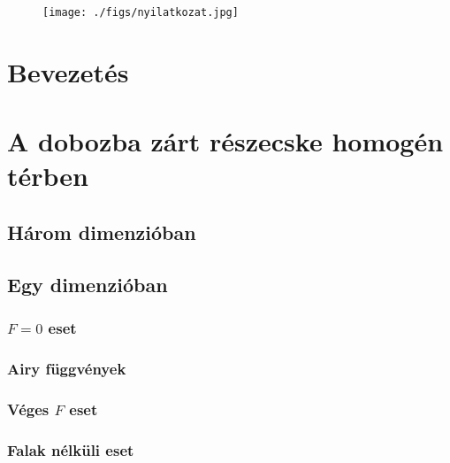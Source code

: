 \documentclass[pdftex,12pt,a4paper]{article}
\begin{document}
\addtolength{\marginparwidth}{50pt}
\begin{figure}[H]
	\centering
	\texttt{[image: ./figs/nyilatkozat.jpg]}
\end{figure}
\newpage


\newpage
{}
{}
\tableofcontents
\listoffigures
\newpage
{}

\section{Bevezetés}
	
\section{A dobozba zárt részecske homogén térben}
	
	\subsection{Három dimenzióban}
		
	\subsection{Egy dimenzióban}
			
		\subsubsection{$F=0$ eset}
			
		\subsubsection{Airy függvények}
			
		\subsubsection{Véges $F$ eset}
			
		\subsubsection{Falak nélküli eset}
			
\end{document}
